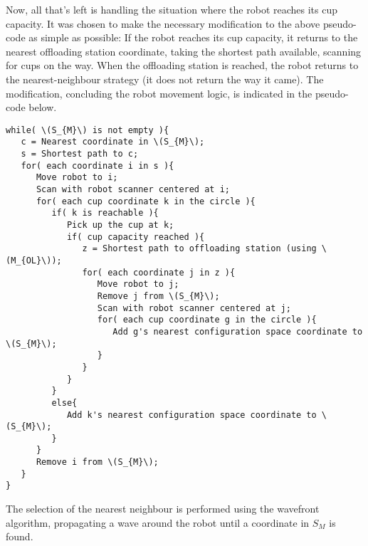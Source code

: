 Now, all that's left is handling the situation where the robot reaches its cup capacity.
It was chosen to make the necessary modification to the above pseudo-code as simple as possible:
If the robot reaches its cup capacity, it returns to the nearest offloading station coordinate,
taking the shortest path available, scanning for cups on the way. When the offloading station is reached,
the robot returns to the nearest-neighbour strategy (it does not return the way it came).
The modification, concluding the robot movement logic, is indicated in the pseudo-code below.

\begin{verbatim}
while( \(S_{M}\) is not empty ){
   c = Nearest coordinate in \(S_{M}\);
   s = Shortest path to c;
   for( each coordinate i in s ){
      Move robot to i;
      Scan with robot scanner centered at i;
      for( each cup coordinate k in the circle ){
         if( k is reachable ){
            Pick up the cup at k;
            if( cup capacity reached ){
               z = Shortest path to offloading station (using \(M_{OL}\));
               for( each coordinate j in z ){
                  Move robot to j;
                  Remove j from \(S_{M}\);
                  Scan with robot scanner centered at j;
                  for( each cup coordinate g in the circle ){
                     Add g's nearest configuration space coordinate to \(S_{M}\);
                  }
               }
            }
         }
         else{
            Add k's nearest configuration space coordinate to \(S_{M}\);
         }
      }
      Remove i from \(S_{M}\);
   }
}
\end{verbatim}

The selection of the nearest neighbour is performed using the wavefront algorithm, propagating
a wave around the robot until a coordinate in \(S_{M}\) is found.
